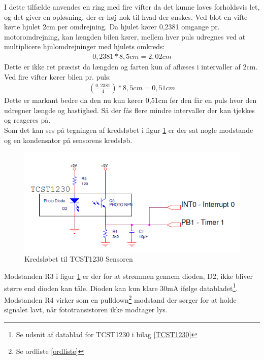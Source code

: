 I dette tilfælde anvendes en ring med fire vifter da det kunne laves forholdsvis let, og det giver en opløsning, der er høj nok til hvad der ønskes. Ved blot en vifte kørte hjulet 2cm per omdrejning. Da hjulet kører 0,2381 omgange pr. motoromdrejning, kan længden bilen kører, mellem hver puls udregnes ved at multiplicere hjulomdrejninger med hjulets omkreds:
\begin{align*}
0,2381*8,5cm = 2,02 cm
\end{align*}
Dette er ikke ret præcist da længden og farten kun af aflæses i intervaller af 2cm. Ved fire vifter kører bilen pr. puls:
\begin{align*}
(\frac{0,2381}{4})* 8,5cm = 0,51cm
\end{align*}
Dette er markant bedre da den nu kun kører 0,51cm før den får en puls hvor den udregner længde og hastighed. Så der fås flere mindre intervaller der kan tjekkes og reageres på. \\ 

Som det kan ses på tegningen af kredsløbet i figur \ref{wheelspeedTegning} er der sat nogle modstande og en kondensator på sensorens kredsløb. \\

\begin{figure}[h!]
\center
\includegraphics[scale=0.75]{./Graphics/TCST1230}
\caption{Kredsløbet til TCST1230 Sensoren}
\label{wheelspeedTegning}
\end{figure}

Modstanden R3 i figur \ref{wheelspeedTegning} er der for at strømmen gennem dioden, D2, ikke bliver større end dioden kan tåle. Dioden kan kun klare 30mA ifølge databladet\footnote{Se udsnit af datablad for TCST1230 i bilag \ref{TCST1230}}.\\

Modstanden R4 virker som en pulldown\footnote{Se ordliste \ref{ordliste}} modstand der sørger for at holde signalet lavt, når fototransistoren ikke modtager lys. \\

